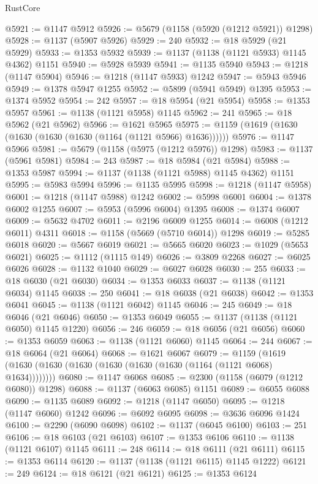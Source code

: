 \begin{lexlean}{RustCore}
\begin{coremodule}
@5921 := @1147 @5912
@5926 := @5679 (@1158 (@5920 (@1212 @5921)) @1298)
@5928 := @1137 (@5907 @5926)
@5929 := 240
@5932 := @18 @5929 (@21 @5929)
@5933 := @1353 @5932
@5939 := @1137 (@1138 (@1121 @5933) @1145 @4362) @1151
@5940 := @5928 @5939
@5941 := @1135 @5940
@5943 := @1218 (@1147 @5904)
@5946 := @1218 (@1147 @5933) @1242
@5947 := @5943 @5946
@5949 := @1378 @5947 @1255
@5952 := @5899 (@5941 @5949) @1395
@5953 := @1374 @5952
@5954 := 242
@5957 := @18 @5954 (@21 @5954)
@5958 := @1353 @5957
@5961 := @1138 (@1121 @5958) @1145
@5962 := 241
@5965 := @18 @5962 (@21 @5962)
@5966 := @1621 @5965
@5975 := @1159 (@1619 (@1630 (@1630 (@1630 (@1630 (@1164 (@1121 @5966) @1636))))))
@5976 := @1147 @5966
@5981 := @5679 (@1158 (@5975 (@1212 @5976)) @1298)
@5983 := @1137 (@5961 @5981)
@5984 := 243
@5987 := @18 @5984 (@21 @5984)
@5988 := @1353 @5987
@5994 := @1137 (@1138 (@1121 @5988) @1145 @4362) @1151
@5995 := @5983 @5994
@5996 := @1135 @5995
@5998 := @1218 (@1147 @5958)
@6001 := @1218 (@1147 @5988) @1242
@6002 := @5998 @6001
@6004 := @1378 @6002 @1255
@6007 := @5953 (@5996 @6004) @1395
@6008 := @1374 @6007
@6009 := @5632 @4702
@6011 := @2196 @6009 @1255
@6014 := @6008 (@1212 @6011) @4311
@6018 := @1158 (@5669 (@5710 @6014)) @1298
@6019 := @5285 @6018
@6020 := @5667 @6019
@6021 := @5665 @6020
@6023 := @1029 (@5653 @6021)
@6025 := @1112 (@1115 @149)
@6026 := @3809 @2268
@6027 := @6025 @6026
@6028 := @1132 @1040
@6029 := @6027 @6028
@6030 := 255
@6033 := @18 @6030 (@21 @6030)
@6034 := @1353 @6033
@6037 := @1138 (@1121 @6034) @1145
@6038 := 250
@6041 := @18 @6038 (@21 @6038)
@6042 := @1353 @6041
@6045 := @1138 (@1121 @6042) @1145
@6046 := 245
@6049 := @18 @6046 (@21 @6046)
@6050 := @1353 @6049
@6055 := @1137 (@1138 (@1121 @6050) @1145 @1220)
@6056 := 246
@6059 := @18 @6056 (@21 @6056)
@6060 := @1353 @6059
@6063 := @1138 (@1121 @6060) @1145
@6064 := 244
@6067 := @18 @6064 (@21 @6064)
@6068 := @1621 @6067
@6079 := @1159 (@1619 (@1630 (@1630 (@1630 (@1630 (@1630 (@1630 (@1164 (@1121 @6068) @1634))))))))
@6080 := @1147 @6068
@6085 := @2300 (@1158 (@6079 (@1212 @6080)) @1298)
@6088 := @1137 (@6063 @6085) @1151
@6089 := @6055 @6088
@6090 := @1135 @6089
@6092 := @1218 (@1147 @6050)
@6095 := @1218 (@1147 @6060) @1242
@6096 := @6092 @6095
@6098 := @3636 @6096 @1424
@6100 := @2290 (@6090 @6098)
@6102 := @1137 (@6045 @6100)
@6103 := 251
@6106 := @18 @6103 (@21 @6103)
@6107 := @1353 @6106
@6110 := @1138 (@1121 @6107) @1145
@6111 := 248
@6114 := @18 @6111 (@21 @6111)
@6115 := @1353 @6114
@6120 := @1137 (@1138 (@1121 @6115) @1145 @1222)
@6121 := 249
@6124 := @18 @6121 (@21 @6121)
@6125 := @1353 @6124

\end{coremodule}
\end{lexlean}
